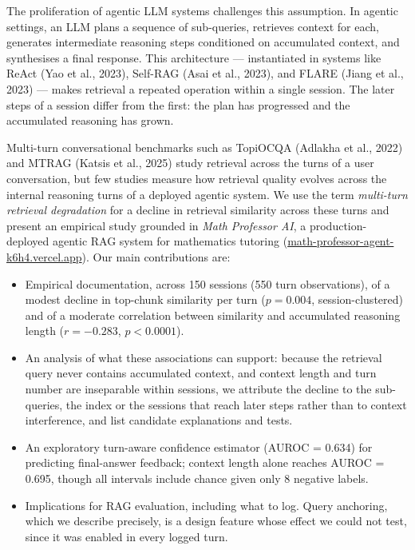 \documentclass[11pt,a4paper]{article}
\begin{document}
The proliferation of agentic LLM systems challenges this assumption. In agentic settings, an LLM plans a
sequence of sub-queries, retrieves context for each, generates intermediate reasoning steps conditioned on
accumulated context, and synthesises a final response. This architecture --- instantiated in systems like
ReAct (Yao et al., 2023), Self-RAG (Asai et al., 2023), and FLARE (Jiang et al., 2023) --- makes retrieval a
repeated operation within a single session. The later steps of a session differ from the first: the plan has
progressed and the accumulated reasoning has grown.

Multi-turn conversational benchmarks such as TopiOCQA (Adlakha et al., 2022) and MTRAG (Katsis et al.,
2025) study retrieval across the turns of a user conversation, but few studies measure how retrieval quality
evolves across the internal reasoning turns of a deployed agentic system. We use the term
\textit{multi-turn retrieval degradation} for a decline in retrieval similarity across these turns and present an
empirical study grounded in \textit{Math Professor AI}, a production-deployed agentic RAG system for
mathematics tutoring (\url{math-professor-agent-k6h4.vercel.app}). Our main contributions are:
\begin{itemize}
  \item Empirical documentation, across 150 sessions (550 turn observations), of a modest decline in top-chunk similarity per turn ($p = 0.004$, session-clustered) and of a moderate correlation between similarity and accumulated reasoning length ($r = -0.283$, $p < 0.0001$).
  \item An analysis of what these associations can support: because the retrieval query never contains accumulated context, and context length and turn number are inseparable within sessions, we attribute the decline to the sub-queries, the index or the sessions that reach later steps rather than to context interference, and list candidate explanations and tests.
  \item An exploratory turn-aware confidence estimator (AUROC = 0.634) for predicting final-answer feedback; context length alone reaches AUROC = 0.695, though all intervals include chance given only 8 negative labels.
  \item Implications for RAG evaluation, including what to log. Query anchoring, which we describe precisely, is a design feature whose effect we could not test, since it was enabled in every logged turn.
\end{itemize}
\end{document}
